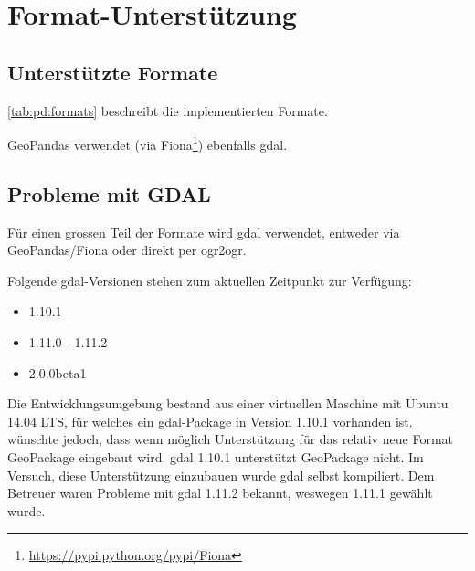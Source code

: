 \section{Format-Unterstützung}
\subsection{Unterstützte Formate}
\cref{tab:pd:formats} beschreibt die implementierten Formate.


GeoPandas verwendet (via Fiona\footnote{\url{https://pypi.python.org/pypi/Fiona}}) ebenfalls \gls{gdal}.

\subsection{Probleme mit GDAL}\label{sec:pd:format-gdal-problems}
Für einen grossen Teil der Formate wird \gls{gdal} verwendet, entweder via GeoPandas/Fiona oder direkt per ogr2ogr. 

Folgende \gls{gdal}-Versionen stehen zum aktuellen Zeitpunkt zur Verfügung:
\begin{itemize}
\item 1.10.1
\item 1.11.0 - 1.11.2
\item 2.0.0beta1
\end{itemize}

Die Entwicklungsumgebung bestand aus einer virtuellen Maschine mit Ubuntu 14.04 LTS, für welches ein \gls{gdal}-Package in Version 1.10.1 vorhanden ist. \proff wünschte jedoch, dass wenn möglich Unterstützung für das relativ neue Format GeoPackage eingebaut wird. \gls{gdal} 1.10.1 unterstützt GeoPackage nicht. Im Versuch, diese Unterstützung einzubauen wurde \gls{gdal} selbst kompiliert. Dem Betreuer waren Probleme mit \gls{gdal} 1.11.2 bekannt, weswegen 1.11.1 gewählt wurde.

